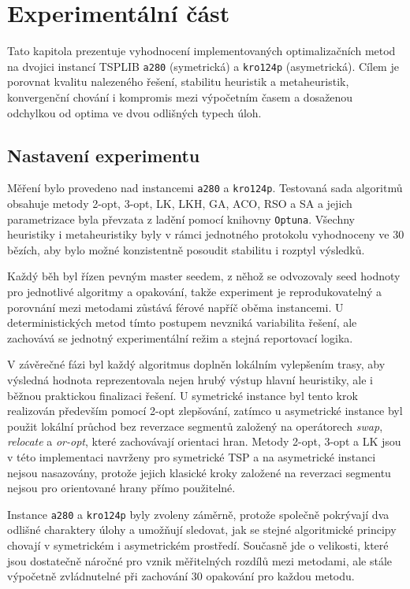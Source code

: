 \chapter{Experimentální část}
Tato kapitola prezentuje vyhodnocení implementovaných optimalizačních metod na dvojici instancí TSPLIB \texttt{a280} (symetrická) a \texttt{kro124p} (asymetrická). Cílem je porovnat kvalitu nalezeného řešení, stabilitu heuristik a metaheuristik, konvergenční chování i kompromis mezi výpočetním časem a dosaženou odchylkou od optima ve dvou odlišných typech úloh.

\section{Nastavení experimentu}
\label{sec:exp_setup}
Měření bylo provedeno nad instancemi \texttt{a280} a \texttt{kro124p}. Testovaná sada algoritmů obsahuje metody 2-opt, 3-opt, LK, LKH, GA, ACO, RSO a SA a jejich parametrizace byla převzata z ladění pomocí knihovny \texttt{Optuna}. Všechny heuristiky i metaheuristiky byly v rámci jednotného protokolu vyhodnoceny ve 30 bězích, aby bylo možné konzistentně posoudit stabilitu i rozptyl výsledků.

Každý běh byl řízen pevným master seedem, z něhož se odvozovaly seed hodnoty pro jednotlivé algoritmy a opakování, takže experiment je reprodukovatelný a porovnání mezi metodami zůstává férové napříč oběma instancemi. U deterministických metod tímto postupem nevzniká variabilita řešení, ale zachovává se jednotný experimentální režim a stejná reportovací logika.

V závěrečné fázi byl každý algoritmus doplněn lokálním vylepšením trasy, aby výsledná hodnota reprezentovala nejen hrubý výstup hlavní heuristiky, ale i běžnou praktickou finalizaci řešení. U symetrické instance byl tento krok realizován především pomocí 2-opt zlepšování, zatímco u asymetrické instance byl použit lokální průchod bez reverzace segmentů založený na operátorech \emph{swap}, \emph{relocate} a \emph{or-opt}, které zachovávají orientaci hran. Metody 2-opt, 3-opt a LK jsou v této implementaci navrženy pro symetrické TSP a na asymetrické instanci nejsou nasazovány, protože jejich klasické kroky založené na reverzaci segmentu nejsou pro orientované hrany přímo použitelné.

Instance \texttt{a280} a \texttt{kro124p} byly zvoleny záměrně, protože společně pokrývají dva odlišné charaktery úlohy a umožňují sledovat, jak se stejné algoritmické principy chovají v symetrickém i asymetrickém prostředí. Současně jde o velikosti, které jsou dostatečně náročné pro vznik měřitelných rozdílů mezi metodami, ale stále výpočetně zvládnutelné při zachování 30 opakování pro každou metodu.

